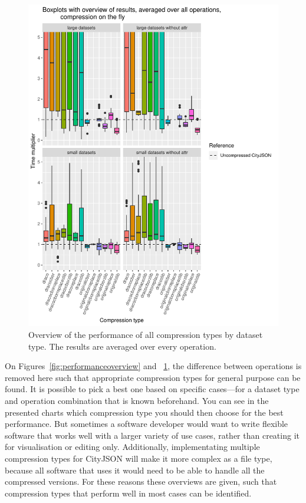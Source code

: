\begin{figure}[h!]
    \includegraphics[scale=0.92]{figs/benchmark/overview/fulloverviewotf.pdf}
    \caption{Overview of the performance of all compression types by dataset type. The results are averaged over every operation.}
    \label{fig:performanceoverviewotf}
\end{figure}

\clearpage


On Figures~\ref{fig:performanceoverview} and ~\ref{fig:performanceoverviewotf}, the difference between operations is removed here such that appropriate compression types for general purpose can be found.
It is possible to pick a best one based on specific cases---for a dataset type and operation combination that is known beforehand.
You can see in the presented charts which compression type you should then choose for the best performance.
But sometimes a software developer would want to write flexible software that works well with a larger variety of use cases, rather than creating it for visualisation or editing only.
Additionally, implementating multiple compression types for CityJSON will make it more complex as a file type, because all software that uses it would need to be able to handle all the compressed versions.
For these reasons these overviews are given, such that compression types that perform well in most cases can be identified.




